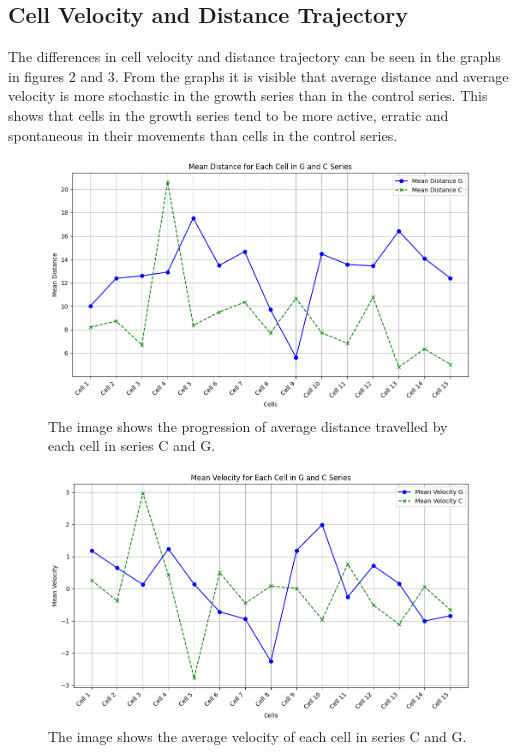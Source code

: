 \documentclass{article}
\begin{document}
\clearpage

\subsection*{Cell Velocity and Distance Trajectory}

The differences in cell velocity and distance trajectory can be seen in the graphs in figures 2 and 3. From the graphs it is visible that average distance and average velocity is more stochastic in the growth series than in the control series. This shows that cells in the growth series tend to be more active, erratic and spontaneous in their movements than cells in the control series. 


\begin{figure}[h!]
\centering
\includegraphics[width=0.75\linewidth]{Report/RImages/Graphs/mean_distance_g_and_c.png}
\caption{\label{fig:Mean_Distance}The image shows the progression of average distance travelled by each cell in series C and G.}
\end{figure}

\begin{figure}[h!]
\centering
\includegraphics[width=0.75\linewidth]{Report/RImages/Graphs/mean_velocity_g_and_c.png}
\caption{\label{fig:Mean_Velocity}The image shows the average velocity of each cell in series C and G.}
\end{figure}
\end{document}
